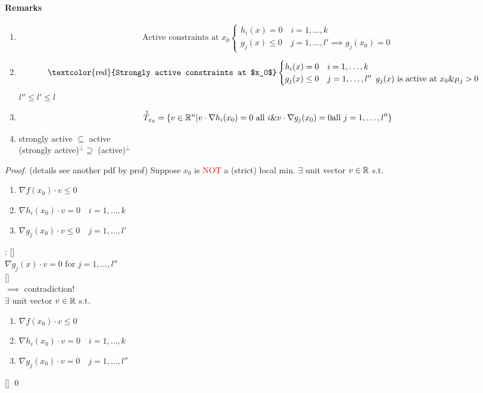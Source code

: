 \documentclass[11pt]{article}
\begin{document}
\paragraph{Remarks}
\begin{enumerate}
	\item $$\text{Active constraints at $x_0$} \begin{cases}
	h_i(x) = 0 \quad i=1,\hdots,k \\
	g_j(x) \leq 0 \quad j = 1,\hdots, l' \implies g_j(x_0) = 0
	\end{cases}$$

	\item $$\text{\textcolor{red}{Strongly active constraints at $x_0$}} 
	\begin{cases}
	h_i(x) = 0 \quad i=1,\hdots,k \\
	g_j(x) \leq 0 \quad j = 1,\hdots, l'' \,\,\, \text{$g_j(x)$ is active at $x_0 \& \mu_j > 0$}
	\end{cases}$$
	$l'' \leq l' \leq l$
	\item $$\tilde{\tilde{T}}_{x_0} = \{ v\in \mathbb{R}^n | v\cdot \nabla h_i(x_0) = 0 \text{ all $i$} \& v \cdot \nabla g_j(x_0) = 0 \text{all $j = 1, \hdots, l''$} \}$$
	\item strongly active $\subseteq$ active \\
	      (strongly active)$^\perp \supseteq$ (active)$^\perp$
\end{enumerate}
\begin{proof}
	(details see another pdf by prof)
	Suppose $x_0$ is \textcolor{red}{NOT} a (strict) local min.
	 $\exists$ unit vector $v \in \mathbb{R}$ s.t.
	\begin{enumerate}
		\item $\nabla f(x_0) \cdot v \leq 0$
		\item $\nabla h_i(x_0) \cdot v = 0 \quad i = 1, \hdots, k$
		\item $\nabla g_j(x_0) \cdot v \leq 0 \quad j = 1, \hdots, l'$
	\end{enumerate}
	: [] \\
	 $\nabla g_j(x)\cdot v = 0$ for $j = 1, \hdots, l''$ \\
	 \\
	$\implies$ contradiction! \\
	 $\exists$ unit vector $v \in \mathbb{R}$ s.t.
	\begin{enumerate}
		\item $\nabla f(x_0) \cdot v \leq 0$
		\item $\nabla h_i(x_0) \cdot v = 0 \quad i = 1, \hdots, k$
		\item $\nabla g_j(x_0) \cdot v = 0 \quad j = 1, \hdots, l''$
	\end{enumerate}
	\qed
\end{proof}
\end{document}
